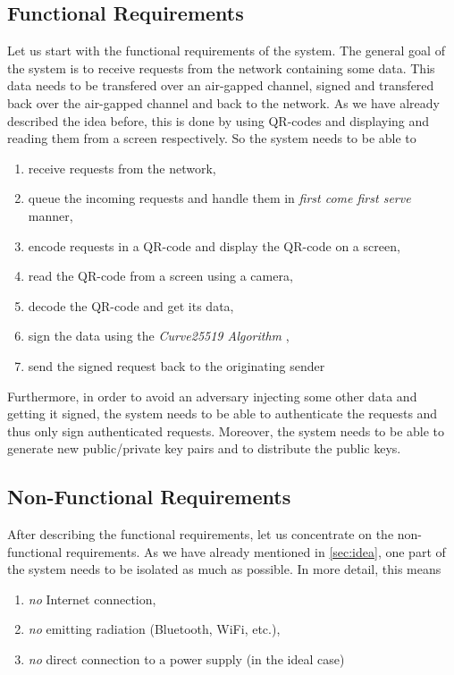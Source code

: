 \subsection{Functional Requirements}\label{subsec:functional}
Let us start with the functional requirements of the system. The general goal of the system is to receive requests from the network containing some data. This data needs to be transfered over an air-gapped channel, signed and transfered back over the air-gapped channel and back to the network. As we have already described the idea before, this is done by using QR-codes and displaying and reading them from a screen respectively. So the system needs to be able to

\begin{enumerate}
\item receive requests from the network,
\item queue the incoming requests and handle them in \emph{first come first serve} manner,
\item encode requests in a QR-code and display the QR-code on a screen,
\item read the QR-code from a screen using a camera,
\item decode the QR-code and get its data,
\item sign the data using the \emph{Curve25519 Algorithm} \citep{bernstein2012high},
\item send the signed request back to the originating sender
\end{enumerate}

Furthermore, in order to avoid an adversary injecting some other data and getting it signed, the system needs to be able to authenticate the requests and thus only sign authenticated requests. Moreover, the system needs to be able to generate new public/private key pairs and to distribute the public keys.


\subsection{Non-Functional Requirements}\label{subse:non-functional}
After describing the functional requirements, let us concentrate on the non-functional requirements. As we have already mentioned in \autoref{sec:idea}, one part of the system needs to be isolated as much as possible. In more detail, this means

\begin{enumerate}
\item \emph{no} Internet connection,
\item \emph{no} emitting radiation (Bluetooth, WiFi, etc.),
\item \emph{no} direct connection to a power supply (in the ideal case)
\end{enumerate}


